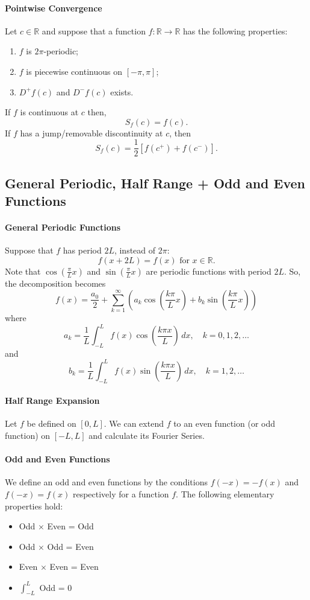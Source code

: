 \paragraph{Pointwise Convergence}
Let \(c \in \mathbb R\) and suppose that a function \(f: \mathbb R \to \mathbb R\) has the following properties:
\begin{enumerate}
    \item \(f\) is \(2\pi\)-periodic;
    \item \(f\) is piecewise continuous on \([-\pi, \pi]\);
    \item \(D^+f(c)\) and \(D^-f(c)\) exists.
\end{enumerate}
If \(f\) is continuous at \(c\) then,
\[S_f(c) = f(c).\]
If \(f\) has a jump/removable discontinuity at \(c\), then 
\[S_f(c) = \frac{1}{2}[f(c^+) + f(c^-)].\]

\subsection{General Periodic, Half Range + Odd and Even Functions}
\paragraph{General Periodic Functions} Suppose that \(f\) has period \(2L\), instead of \(2\pi\):
\[f(x+2L) = f(x) \text{ for } x\in\mathbb R.\]
Note that \(\cos\left(\frac{\pi}{L}x\right)\) and \(\sin\left(\frac{\pi}{L}x\right)\) are periodic functions with period \(2L\). So, the decomposition becomes
\[f(x) = \frac{a_0}{2} + \sum_{k=1}^\infty \left(a_k\cos\left(\frac{k\pi}{L}x\right) + b_k\sin\left(\frac{k\pi}{L}x\right)\right) \]
where 
\[a_k = \frac{1}{L}\int_{-L}^{L} f(x)\cos\left(\frac{k\pi x}{L}\right) \, dx, \quad k=0,1,2,\dots\]
and 
\[b_k = \frac{1}{L} \int_{-L}^L f(x)\sin\left(\frac{k\pi x}{L}\right) \, dx, \quad k = 1,2,\dots\]

\paragraph{Half Range Expansion}
Let \(f\) be defined on \([0, L]\). We can extend \(f\) to an even function (or odd function) on \([-L, L]\) and calculate its Fourier Series.

\paragraph{Odd and Even Functions}
We define an odd and even functions by the conditions \(f(-x)=-f(x)\) and \(f(-x) = f(x)\) respectively for a function \(f\). The following elementary properties hold: 
\begin{itemize}
    \item Odd \(\times\) Even = Odd
    \item Odd \(\times\) Odd = Even
    \item Even \(\times\) Even  = Even
    \item \(\int_{-L}^{L}\) Odd = 0
\end{itemize}

